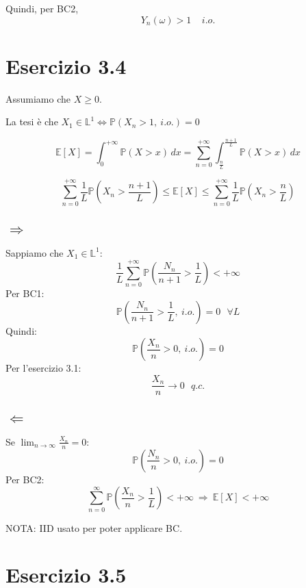 \documentclass{article}
\begin{document}
Quindi, per BC2,
\[
	Y_n(\omega )>1\ \ \ \ \ i.o.
\]


\section{Esercizio 3.4}
\begin{comment}

\[
	\mathbb{P}\left(|X_1|>x\right) = \left(\mathbb{P}\left(\bigcap_{n} \left\{|X_n| > x\right\}\right)\right)^{\frac{1}{n}} = \exp \left[\frac{1}{n} \ln \mathbb{P}\left(\bigcap_n \left\{|X_n| > x\right\}\right)\right]
\]
\end{comment}
Assumiamo che $X\geq 0$.

La tesi è che $X_1\in \mathbb{L}^1 \Leftrightarrow  \mathbb{P}\left(X_n >1,\ i.o.\right)=0$

\[\mathbb{E}\left[X\right] = \int_{0}^{+\infty }\mathbb{P}\left(X>x\right)\,dx = \sum_{n=0}^{+\infty }\int_{\frac{n}{L}}^{\frac{n+1}{L}} \mathbb{P}\left(X>x\right)\,dx\]

\[\sum_{n=0}^{+\infty } \frac{1}{L} \mathbb{P}\left(X_n> \frac{n+1}{L}\right) \leq  \mathbb{E}\left[X\right] \leq  \sum_{n=0}^{+\infty }\frac{1}{L}\mathbb{P}\left(X_n>\frac{n}{L}\right)\]

\subsection{$\Rightarrow $}
Sappiamo che $X_1\in \mathbb{L}^1$:
\[
	\frac{1}{L}\sum_{n=0}^{+\infty }\mathbb{P}\left(\frac{N_n}{n+1}>\frac{1}{L}\right)<+\infty 
\]
Per BC1:
\[
	\mathbb{P}\left(\frac{N_n}{n+1}>\frac{1}{L},\ i.o.\right) = 0\ \ \ \forall L 
\]
Quindi:
\[
	\mathbb{P}\left(\frac{X_n}{n}>0,\ i.o.\right)=0
\]
Per l'esercizio 3.1:
\[
	\frac{X_n}{n}\longrightarrow 0\ \ \ q.c.
\]

\subsection{$\Leftarrow $}
Se $\lim_{n\rightarrow \infty }\frac{X_n}{n}=0$:
\[
	\mathbb{P}\left(\frac{N_n}{n}>0,\ i.o.\right)=0
\]
Per BC2:
\[
	\sum_{n=0}^{\infty }\mathbb{P}\left(\frac{X_n}{n}>\frac{1}{L}\right)<+\infty \ \Rightarrow \ \mathbb{E}\left[X\right]<+\infty 
\]

NOTA: IID usato per poter applicare BC.

\section{Esercizio 3.5}
\end{document}
